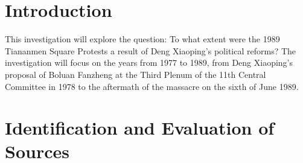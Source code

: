 \documentclass{paper}
\begin{document}
\insertTitlePage

\section*{Introduction}
\begin{doublespace}
This investigation will explore the question: To what extent were the 1989 Tiananmen Square Protests a result of Deng Xiaoping's political reforms? The investigation will focus on the years from 1977 to 1989, from Deng Xiaoping’s proposal of Boluan Fanzheng at the Third Plenum of the 11th Central Committee in 1978 to the aftermath of the massacre on the sixth of June 1989.
\end{doublespace}

\section{Identification and Evaluation of Sources}
\begin{doublespace}


\end{doublespace}
\end{document}
